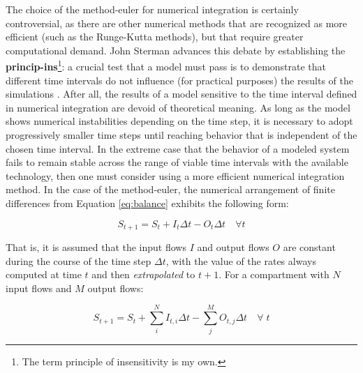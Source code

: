 \documentclass[./main_en.tex]{subfiles}
\begin{document}
\par The choice of the \gls{method-euler} for numerical integration is certainly controversial, as there are other numerical methods that are recognized as more efficient (such as the Runge-Kutta methods), but that require greater computational demand. John Sterman advances this debate by establishing the \textbf{\gls{princip-ins}}\footnote{The term principle of insensitivity is my own.}: a crucial test that a \gls{model} must pass is to demonstrate that different time intervals do not influence (for practical purposes) the results of the simulations \cite{sterman2000}. After all, the results of a \gls{model} sensitive to the time interval defined in numerical integration are devoid of theoretical meaning. As long as the \gls{model} shows numerical instabilities depending on the time step, it is necessary to adopt progressively smaller time steps until reaching behavior that is independent of the chosen time interval. In the extreme case that the behavior of a modeled \gls{system} fails to remain stable across the range of viable time intervals with the available technology, then one must consider using a more efficient numerical integration method. In the case of the \gls{method-euler}, the numerical arrangement of finite differences from Equation \eqref{eq:balance} exhibits the following form:
\begin{linenomath*}
\begin{equation} 
	\label{eq:balance_numeric}
	S_{t+1} = S_{t} + I_{t}\Delta t - O_{t}\Delta t \quad \forall t
\end{equation}
\end{linenomath*}
That is, it is assumed that the input flows $I$ and output flows $O$ are constant during the course of the time step $\Delta t$, with the value of the rates always computed at time $t$ and then \textit{extrapolated} to $t+1$. For a compartment with $N$ input flows and $M$ output flows:
\begin{linenomath*}
\begin{equation} 
	\label{eq:balance_numeric_expanded}
	S_{t+1} = S_{t} + \sum_{i}^{N} I_{t, i}\Delta t - \sum_{j}^{M}O_{t, j}\Delta t \quad \forall \; t
\end{equation}
\end{linenomath*}
\end{document}
